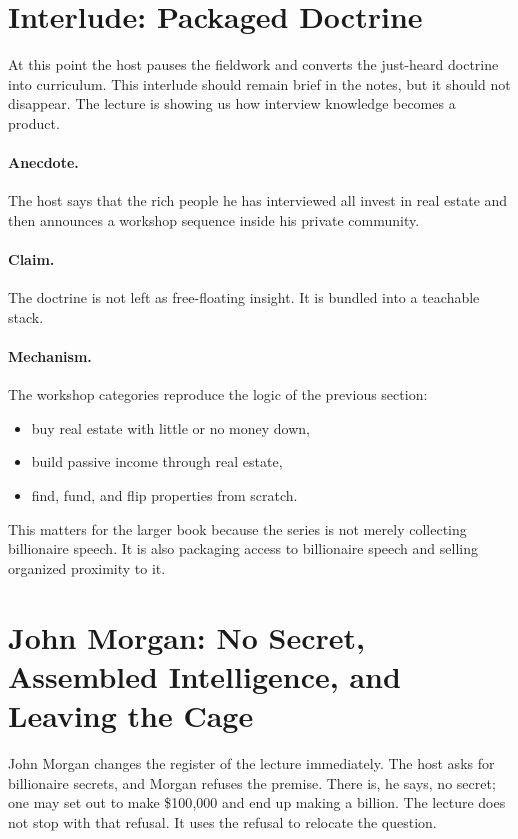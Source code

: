 \section{Interlude: Packaged Doctrine}

At this point the host pauses the fieldwork and converts the just-heard doctrine into curriculum. This interlude should remain brief in the notes, but it should not disappear. The lecture is showing us how interview knowledge becomes a product.

\paragraph{Anecdote.}
The host says that the rich people he has interviewed all invest in real estate and then announces a workshop sequence inside his private community.

\paragraph{Claim.}
The doctrine is not left as free-floating insight. It is bundled into a teachable stack.

\paragraph{Mechanism.}
The workshop categories reproduce the logic of the previous section:
\begin{itemize}
\item buy real estate with little or no money down,
\item build passive income through real estate,
\item find, fund, and flip properties from scratch.
\end{itemize}

This matters for the larger book because the series is not merely collecting billionaire speech. It is also packaging access to billionaire speech and selling organized proximity to it.

\section{John Morgan: No Secret, Assembled Intelligence, and Leaving the Cage}

John Morgan changes the register of the lecture immediately. The host asks for billionaire secrets, and Morgan refuses the premise. There is, he says, no secret; one may set out to make \$100{,}000 and end up making a billion. The lecture does not stop with that refusal. It uses the refusal to relocate the question.

